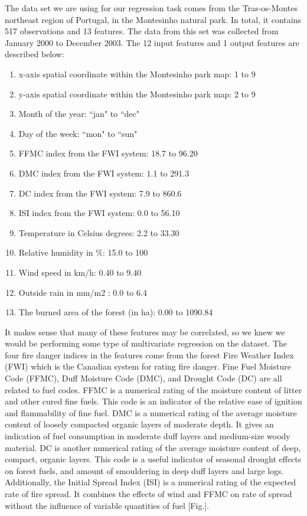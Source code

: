 \documentclass{article}
\begin{document}
The data set we are using for our regression task comes from the Tras-os-Montes northeast region of Portugal, in the Montesinho natural park.  In total, it contains 517 observations and 13 features.  The data from this set was collected from January 2000 to December 2003.  The 12 input features and 1 output features are described below:
\begin{enumerate}
\item x-axis spatial coordinate within the Montesinho park map: 1 to 9
\item y-axis spatial coordinate within the Montesinho park map: 2 to 9
\item Month of the year: ``jan" to ``dec" 
\item Day of the week: ``mon" to ``sun"
\item FFMC index from the FWI system: 18.7 to 96.20
\item DMC index from the FWI system: 1.1 to 291.3 
\item DC index from the FWI system: 7.9 to 860.6 
\item ISI index from the FWI system: 0.0 to 56.10
\item Temperature in Celsius degrees: 2.2 to 33.30
\item Relative humidity in \%: 15.0 to 100
\item Wind speed in km/h: 0.40 to 9.40 
\item Outside rain in mm/m2 : 0.0 to 6.4 
\item The burned area of the forest (in ha): 0.00 to 1090.84 
\end{enumerate}

It makes sense that many of these features may be correlated, so we knew we would be performing some type of multivariate regression on the dataset.  The four fire danger indices in the features come from the forest Fire Weather Index (FWI) which is the Canadian system for rating fire danger.  Fine Fuel Moisture Code (FFMC), Duff Moisture Code (DMC), and Drought Code (DC) are all related to fuel codes.  FFMC is a numerical rating of the moisture content of litter and other cured fine fuels.  This code is an indicator of the relative ease of ignition and flammability of fine fuel.  DMC is a numerical rating of the average moisture content of loosely compacted organic layers of moderate depth.  It gives an indication of fuel consumption in moderate duff layers and medium-size woody material.  DC is another numerical rating of the average moisture content of deep, compact, organic layers.  This code is a useful indicator of seasonal drought effects on forest fuels, and amount of smouldering in deep duff layers and large logs.  Additionally, the Initial Spread Index (ISI) is a numerical rating of the expected rate of fire spread.  It combines the effects of wind and FFMC on rate of spread without the influence of variable quantities of fuel [Fig.].  
\end{document}
